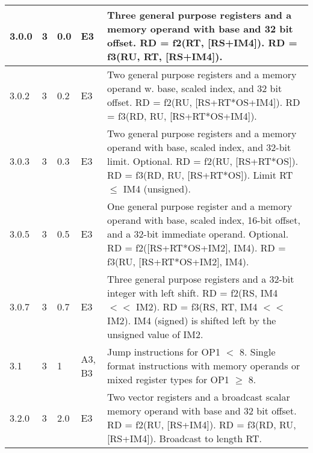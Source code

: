 \documentclass[forwardcom.tex]{subfiles}
\begin{document}
\begin{longtable} {|p{10mm}|p{6mm}|p{9mm}|p{7mm}|p{80mm}|}
\hline
3.0.0 & 3 & 0.0  & E3 & Three general purpose registers and a memory operand with base and 32 bit offset.\newline 
RD = f2(RT, [RS+IM4]). \newline 
RD = f3(RU, RT, [RS+IM4]).\\

\hline
3.0.2 & 3 & 0.2  & E3 & Two general purpose registers and a memory operand w. base, scaled index, and 32 bit offset.\newline 
RD = f2(RU, [RS+RT*OS+IM4]). \newline 
RD = f3(RD, RU, [RS+RT*OS+IM4]). \\

\hline
3.0.3 & 3 & 0.3  & E3 & Two general purpose registers and a memory operand with base, scaled index, and 32-bit limit. Optional. \newline 
RD = f2(RU, [RS+RT*OS]). \newline 
RD = f3(RD, RU, [RS+RT*OS]). \newline 
Limit RT $\leq$ IM4 (unsigned). \\

\hline
3.0.5 & 3 & 0.5  & E3 & One general purpose register and a memory operand with base, scaled index, 16-bit offset, and a 32-bit immediate operand. Optional. \newline 
RD = f2([RS+RT*OS+IM2], IM4). \newline 
RD = f3(RU, [RS+RT*OS+IM2], IM4). \\ 

\hline
3.0.7 & 3 & 0.7  & E3 & Three general purpose registers and a 32-bit integer with left shift.\newline 
RD = f2(RS, IM4 $<<$ IM2). \newline 
RD = f3(RS, RT, IM4 $<<$ IM2). \newline 
IM4 (signed) is shifted left by the unsigned value of IM2. \\

\hline
3.1 & 3 & 1 & A3, B3 & Jump instructions for OP1 $<$ 8. Single format instructions with memory operands or mixed register types for OP1 $\geq$ 8.\\

\hline
3.2.0 & 3 & 2.0 & E3 & Two vector registers and a broadcast scalar memory operand with base and 32 bit offset.\newline 
RD = f2(RU, [RS+IM4]). \newline 
RD = f3(RD, RU, [RS+IM4]). \newline 
Broadcast to length RT.\\


\end{longtable}
\end{document}

